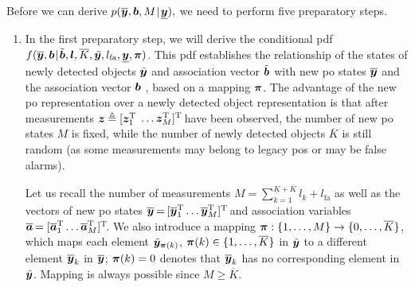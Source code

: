 \documentclass[11pt,a4paper]{article}
\newcommand{\ist}{\hspace*{.3mm}}
\newcommand{\rmv}{\hspace*{-.3mm}}
\newcommand{\T}{\text{T}}
\newcommand{\ynew}{\overline{\V{y}}}
\newcommand{\Knew}{\overline{K}}
\newcommand{\yt}{\tilde{\V{y}}}
\newcommand{\lfa}{l_{\mathrm{fa}}}
\begin{document}
Before we can derive $p(\overline{\V{y}}, \V{b}, M \ist | \ist \underline{\V{y}}),$ we need to perform five preparatory \vspace{-1mm} steps.
\begin{enumerate}
\item In the first preparatory step, we will derive the conditional pdf $f(\overline{\V{y}}, \V{b} \ist | \ist \tilde{\V{b}}, \V{l}, \overline{K}, \tilde{\V{y}}, l_{\mathrm{fa}}, \underline{\V{y}}, \V{\pi})$. This \ac{pdf} establishes the relationship of the states of newly detected objects $\tilde{\bm{y}}$ and association vector $\tilde{\bm{b}}$ with new \ac{po} states $\overline{\bm{y}}$ and the association vector $\bm{b}$  \cite[Section~II-D]{MeyWil:J21}, based on a mapping $\bm{\pi}$. The advantage of the new \ac{po} representation over a newly detected object representation is that after measurements $\V{z} \triangleq [\V{z}^{\T}_{1}$ $\dots \V{z}^{\T}_{{M}} ]^{\T}\rmv\rmv$ have been observed, the number of new \ac{po} states $M$ is fixed, while the number of newly detected objects $\overline{K}$ is still random (as some measurements may belong to legacy \acp{po} or may be false alarms).


Let us recall the number of measurements $M = \sum_{k=1}^{\underline{K} + \overline{K}} l_k + \lfa$ as well as the vectors of new \ac{po} states $\overline{\V{y}} \rmv=\rmv [\overline{\V{y}}^{\T}_1 \dots \overline{\V{y}}^{\T}_M]^{\T}\rmv\rmv$ and association variables $\overline{\V{a}} \rmv= [\overline{\V{a}}^{\T}_1 \dots \overline{\V{a}}^{\T}_M]^{\T}\rmv\rmv$. We also introduce a mapping $\V{\pi} : \{1,\dots,M\} \rightarrow \{0,\dots,\Knew\}$, which maps each element $\yt_{\V{\pi}(k)}$, $\bm{\pi}(k) \in \{1,\dots,\overline{K}\}$ in $\yt$ to a different element $\ynew_k$ in $\ynew$; $\bm{\pi}(k)=0$ denotes that $\ynew_k$ has no corresponding element in $\yt$. Mapping is always possible since $M \geq \overline{K}$.


\end{enumerate}
\end{document}

